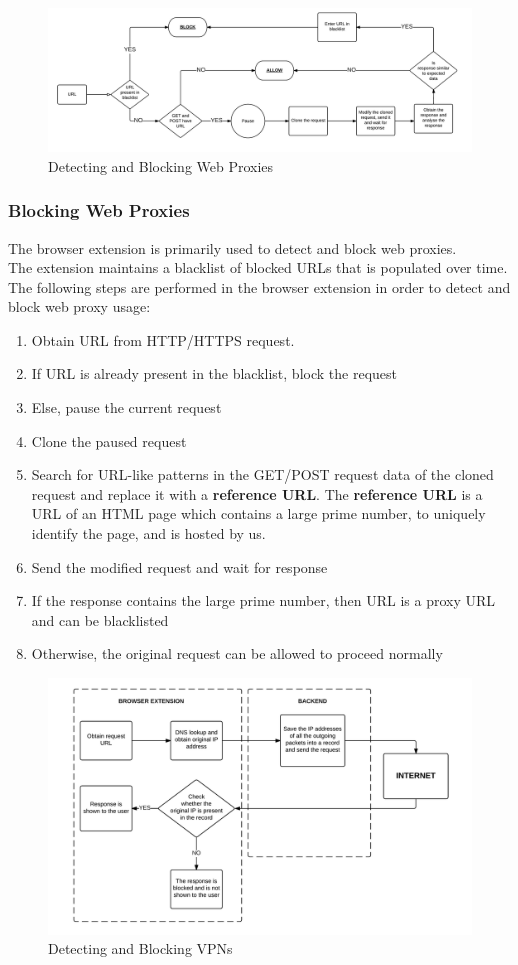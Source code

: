 \documentclass[a4paper,11pt,twocolumn]{article}
\begin{document}
\begin{figure}[htp]
\centering
\includegraphics[scale=1.00]{rsz_proxy_avoiding_firewall_-_new_page.png}
\caption{Detecting and Blocking Web Proxies}
\label{}
\end{figure}
\subsubsection{Blocking Web Proxies}
The browser extension is primarily used to detect and block web proxies. \\The extension maintains a blacklist of blocked URLs that is populated over time.
The following steps are performed in the browser extension in order to detect and block web proxy usage:
\begin{enumerate}
\item Obtain URL from HTTP/HTTPS request.
\item If URL is already present in the blacklist, block the request
\item Else, pause the current request
\item Clone the paused request
\item Search for URL-like patterns in the GET/POST request data of the cloned request and replace it with a \textbf{reference URL}. The  \textbf{reference URL} is a URL of an HTML page which contains a large prime number, to uniquely identify the page, and is hosted by us.
\item Send the modified request and wait for response
\item If the response contains the large prime number, then URL is a proxy URL and can be blacklisted
\item Otherwise, the original request can be allowed to proceed normally
\end{enumerate}
\begin{figure}[htp]
\centering
\includegraphics[scale=1.00]{rsz_vpn_flow_diagram_-_new_page.png}
\caption{Detecting and Blocking VPNs}
\label{}
\end{figure}
\end{document}
